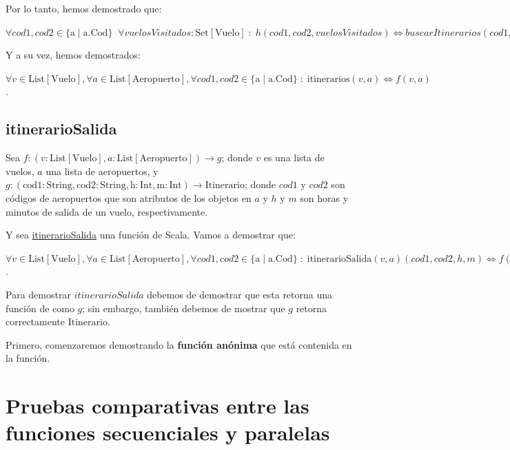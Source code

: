 \documentclass[letterpaper]{article}
\begin{document}
Por lo tanto, hemos demostrado que:

\begin{center}
  $\forall cod1, cod2 \in \{ \text{a} \mid \text{a.Cod}\} \; \; \forall vuelosVisitados : \text{Set}[\text{Vuelo}] \; : \; h(cod1, cod2, vuelosVisitados) \Longleftrightarrow buscarItinerarios(cod1, cod2, vuelosVisitados)$
\end{center}

Y a su vez, hemos demostrados:

\begin{center}
  $\forall v \in \text{List}[\text{Vuelo}], \forall a \in \text{List}[\text{Aeropuerto}], \forall cod1, cod2 \in \{ \text{a} \mid \text{a.Cod}\} \; : \; \text{itinerarios}(v, a) \Longleftrightarrow f(v, a)$.
\end{center}


\subsection{itinerarioSalida}

Sea $f: (v: \text{List}[\text{Vuelo}], a: \text{List}[\text{Aeropuerto}]) \rightarrow g$;
donde $v$ es una lista de vuelos, $a$ una lista de aeropuertos,
y $g: (\text{cod1}: \text{String}, \text{cod2}: \text{String}, \text{h}: \text{Int}, \text{m}: \text{Int}) \rightarrow \text{Itinerario}$;
donde $cod1$ y $cod2$ son códigos de aeropuertos que son atributos de los objetos en $a$ y $h$ y $m$ son horas y minutos de salida de un vuelo, respectivamente.


Y sea \hyperref[itinerarioSalida]{itinerarioSalida} una función de Scala. Vamos a demostrar que:

\begin{center}
  $\forall v \in \text{List}[\text{Vuelo}], \forall a \in \text{List}[\text{Aeropuerto}], \forall cod1, cod2 \in \{ \text{a} \mid \text{a.Cod}\} \; : \; \text{itinerarioSalida}(v, a)(cod1, cod2, h, m) \Longleftrightarrow f(v, a)(cod1, cod2, h, m)$.
\end{center}

Para demostrar $itinerarioSalida$ debemos de demostrar que esta retorna una función
de como $g$; sin embargo, también debemos de mostrar que $g$ retorna correctamente $\text{Itinerario}$.

Primero, comenzaremos demostrando la \textbf{función anónima}
que está contenida en la función.


\section{Pruebas comparativas entre las funciones secuenciales y paralelas}
\end{document}
